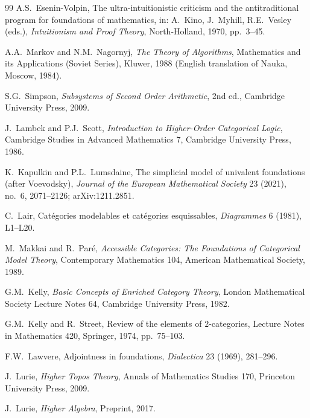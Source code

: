 \documentclass[11pt]{article}
\theoremstyle{plain}
\theoremstyle{definition}
\begin{document}
\begin{thebibliography}{99}
A.S.~Esenin-Volpin,
\newblock The ultra-intuitionistic criticism and the antitraditional program for foundations of mathematics,
\newblock in: A.~Kino, J.~Myhill, R.E.~Vesley (eds.), \emph{Intuitionism and Proof Theory}, North-Holland, 1970, pp.~3--45.

A.A.~Markov and N.M.~Nagornyj,
\newblock \emph{The Theory of Algorithms},
\newblock Mathematics and its Applications (Soviet Series), Kluwer, 1988 (English translation of Nauka, Moscow, 1984).

S.G.~Simpson,
\newblock \emph{Subsystems of Second Order Arithmetic},
\newblock 2nd ed., Cambridge University Press, 2009.

J.~Lambek and P.J.~Scott,
\newblock \emph{Introduction to Higher-Order Categorical Logic},
\newblock Cambridge Studies in Advanced Mathematics 7, Cambridge University Press, 1986.

K.~Kapulkin and P.L.~Lumsdaine,
\newblock The simplicial model of univalent foundations (after Voevodsky),
\newblock \emph{Journal of the European Mathematical Society} 23 (2021), no.~6, 2071--2126; arXiv:1211.2851.

C.~Lair,
\newblock Cat\'egories modelables et cat\'egories esquissables,
\newblock \emph{Diagrammes} 6 (1981), L1--L20.

M.~Makkai and R.~Par\'e,
\newblock \emph{Accessible Categories: The Foundations of Categorical Model Theory},
\newblock Contemporary Mathematics 104, American Mathematical Society, 1989.

G.M.~Kelly,
\newblock \emph{Basic Concepts of Enriched Category Theory},
\newblock London Mathematical Society Lecture Notes 64, Cambridge University Press, 1982.

G.M.~Kelly and R.~Street,
\newblock Review of the elements of $2$-categories,
\newblock Lecture Notes in Mathematics 420, Springer, 1974, pp.~75--103.

F.W.~Lawvere,
\newblock Adjointness in foundations,
\newblock \emph{Dialectica} 23 (1969), 281--296.

J.~Lurie,
\newblock \emph{Higher Topos Theory},
\newblock Annals of Mathematics Studies 170, Princeton University Press, 2009.

J.~Lurie,
\newblock \emph{Higher Algebra},
\newblock Preprint, 2017.


\end{thebibliography}
\end{document}
